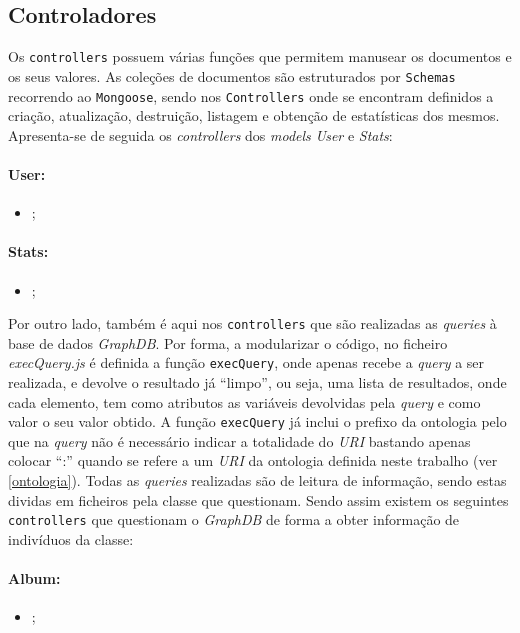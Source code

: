 \documentclass{article}
\begin{document}
\subsection{Controladores}

Os \texttt{controllers} possuem várias funções que permitem manusear os documentos e os seus valores. As coleções de documentos são estruturados por \texttt{Schemas} recorrendo ao \texttt{Mongoose}, sendo nos \texttt{Controllers} onde se encontram definidos a criação, atualização, destruição, listagem e obtenção de estatísticas dos mesmos. Apresenta-se de seguida os \textit{controllers} dos \textit{models} \textit{User} e \textit{Stats}:

\paragraph{\textbf{User:}}
    \begin{itemize}
        \item \texttt{} ;
    \end{itemize}

\paragraph{\textbf{Stats:}}
    \begin{itemize}
        \item \texttt{} ;
    \end{itemize}

Por outro lado, também é aqui nos \texttt{controllers} que são realizadas as \textit{queries} à base de dados \textit{GraphDB}. Por forma, a modularizar o código, no ficheiro \textit{execQuery.js} é definida a função \texttt{execQuery}, onde apenas recebe a \textit{query} a ser realizada, e devolve o resultado já ``limpo'', ou seja, uma lista de resultados, onde cada elemento, tem como atributos as variáveis devolvidas pela \textit{query} e como valor o seu valor obtido. A função \texttt{execQuery} já inclui o prefixo da ontologia pelo que na \textit{query} não é necessário indicar a totalidade do \textit{URI} bastando apenas colocar ``:'' quando se refere a um \textit{URI} da ontologia definida neste trabalho (ver \ref{ontologia}). Todas as \textit{queries} realizadas são de leitura de informação, sendo estas dividas em ficheiros pela classe que questionam. Sendo assim existem os seguintes \texttt{controllers} que questionam o \textit{GraphDB} de forma a obter informação de indivíduos da classe:

\paragraph{\textbf{Album:}}
    \begin{itemize}
        \item \texttt{} ;
    \end{itemize}
\end{document}
